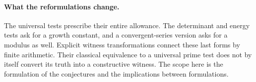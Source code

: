 \paragraph{What the reformulations change.}
The universal tests prescribe their entire allowance. The determinant and energy tests ask for a growth constant, and a convergent-series version asks for a modulus as well. Explicit witness transformations connect these last forms by finite arithmetic. Their classical equivalence to a universal prime test does not by itself convert its truth into a constructive witness. The scope here is the formulation of the conjectures and the implications between formulations.
